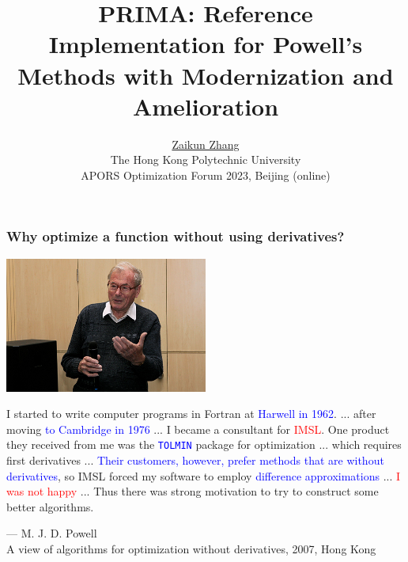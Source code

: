 \documentclass[slidestop,mathserif,xcolor=dvipsnames]{beamer}
\title[\insertsection]
{PRIMA: Reference Implementation for Powell's Methods with Modernization and Amelioration}
\author[]{
  {\href{https://www.zhangzk.net}{Zaikun Zhang}}
  \\[2ex]{\small The Hong Kong Polytechnic University}\\[3ex]
    {
        APORS Optimization Forum 2023, Beijing (online)
        \\[9ex]
    }%
	}
\date{}
\newcommand{\red}[1]{\textcolor{red}{#1}}
\begin{document}
\begin{frame}[plain]
  \titlepage
\end{frame}

\begin{frame}
    \frametitle{Why optimize a function without using derivatives?}
    \vspace{-2ex}
    \begin{center}
    \includegraphics[width=0.5\textwidth]{Powell.jpg}
    \end{center}
    \begin{beamerboxesrounded}[width=12.08cm,shadow=true]{}
      \small
      I started to write computer programs in {Fortran}
        at \textcolor{blue}{Harwell in 1962}.
        ... after moving \textcolor{blue}{to Cambridge in 1976} ...  I became a consultant
        for \red{IMSL}. One product they received from me was the
        \texttt{\textcolor{blue}{TOLMIN}} package
    for optimization ... which requires first derivatives ...
    \textcolor{blue}{Their
    customers, however,
    prefer methods that are without derivatives}, so IMSL forced my
    software
    to employ \textcolor{blue}{difference approximations} ...
    \textcolor{red}{I was not happy} ... Thus there was strong motivation to try to
    construct some better algorithms.
    \end{beamerboxesrounded}
    \vspace{-0.3ex}
    \begin{flushright}
        --- {M. J. D. Powell}
    \vspace{0.3ex}
        \small{\\A view of algorithms for optimization without
        derivatives, 2007, Hong Kong}
    \end{flushright}
\end{frame}
\end{document}
